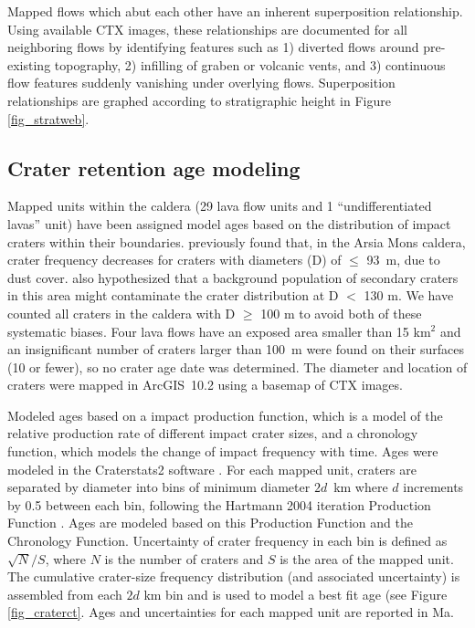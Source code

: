 \documentclass[12pt,letter]{article}
\begin{document}
Mapped flows which abut each other have an inherent superposition relationship. Using available CTX images, these relationships are documented for all neighboring flows by identifying features such as 1) diverted flows around pre-existing topography, 2) infilling of graben or volcanic vents, and 3) continuous flow features suddenly vanishing under overlying flows. Superposition relationships are graphed according to stratigraphic height in Figure \ref{fig_stratweb}.

\subsection{Crater retention age modeling}

Mapped units within the caldera (29 lava flow units and 1 ``undifferentiated lavas'' unit) have been assigned model ages based on the distribution of impact craters within their boundaries. \citet{robbins2011volcanic} previously found that, in the Arsia Mons caldera, crater frequency decreases for craters with diameters (D) of $\le$ 93~m, due to dust cover. \citet{robbins2011volcanic} also hypothesized that a background population of secondary craters in this area might contaminate the crater distribution at D $<$ 130 m. We have counted all craters in the caldera with D $\ge$ 100 m to avoid both of these systematic biases. Four lava flows have an exposed area smaller than 15 km$^2$ and an insignificant number of craters larger than 100~m were found on their surfaces (10 or fewer), so no crater age date was determined. The diameter and location of craters were mapped in ArcGIS~10.2 using a basemap of CTX images.

Modeled ages based on a impact production function, which is a model of the relative production rate of different impact crater sizes, and a chronology function, which models the change of impact frequency with time. Ages were modeled in the Craterstats2 software \citep{michael2013planetary}. For each mapped unit, craters are separated by diameter into bins of minimum diameter $2d$~km where $d$ increments by 0.5 between each bin, following the Hartmann 2004 iteration Production Function \citep{hartmann2005martian}. Ages are modeled based on this Production Function and the \citet{michael2013planetary} Chronology Function. Uncertainty of crater frequency in each bin is defined as $\sqrt{N}/S$, where $N$ is the number of craters and $S$ is the area of the mapped unit. The cumulative crater-size frequency distribution (and associated uncertainty) is assembled from each $2d$ km bin and is used to model a best fit age (see Figure \ref{fig_craterct}. Ages and uncertainties for each mapped unit are reported in Ma.
\end{document}
